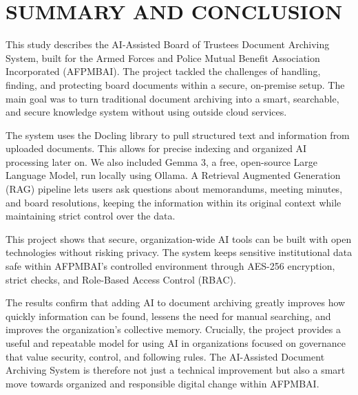
\section{SUMMARY AND CONCLUSION}
    This study describes the AI-Assisted Board of Trustees Document Archiving System, built for the Armed Forces and Police Mutual Benefit Association Incorporated (AFPMBAI). The project tackled the challenges of handling, finding, and protecting board documents within a secure, on-premise setup. The main goal was to turn traditional document archiving into a smart, searchable, and secure knowledge system without using outside cloud services.

    The system uses the Docling library to pull structured text and information from uploaded documents. This allows for precise indexing and organized AI processing later on. We also included Gemma 3, a free, open-source Large Language Model, run locally using Ollama. A Retrieval Augmented Generation (RAG) pipeline lets users ask questions about memorandums, meeting minutes, and board resolutions, keeping the information within its original context while maintaining strict control over the data.

    This project shows that secure, organization-wide AI tools can be built with open technologies without risking privacy. The system keeps sensitive institutional data safe within AFPMBAI’s controlled environment through AES-256 encryption, strict checks, and Role-Based Access Control (RBAC).

    The results confirm that adding AI to document archiving greatly improves how quickly information can be found, lessens the need for manual searching, and improves the organization's collective memory. Crucially, the project provides a useful and repeatable model for using AI in organizations focused on governance that value security, control, and following rules. The AI-Assisted Document Archiving System is therefore not just a technical improvement but also a smart move towards organized and responsible digital change within AFPMBAI.